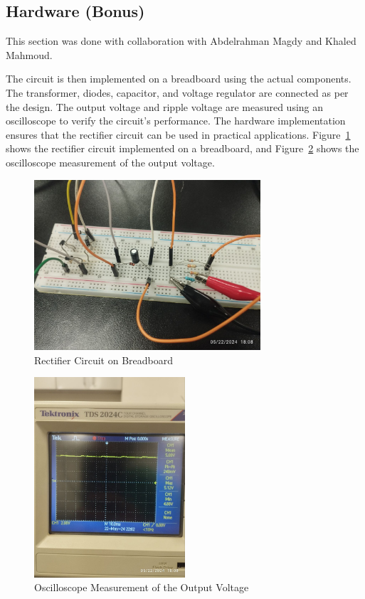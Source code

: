 \documentclass{zc-ust-hw}
\begin{document}
\subsection{Hardware (Bonus)}

This section was done with collaboration with Abdelrahman Magdy and Khaled Mahmoud.

The circuit is then implemented on a breadboard using the actual components. The
transformer, diodes, capacitor, and voltage regulator are connected as per the
design. The output voltage and ripple voltage are measured using an oscilloscope
to verify the circuit's performance. The hardware implementation ensures that
the rectifier circuit can be used in practical applications. Figure~\ref{fig:breadboard-circuit} shows the rectifier circuit implemented on a breadboard, and Figure~\ref{fig:oscilloscope-measurement} shows the oscilloscope measurement of the output voltage.

\begin{figure}[h]
  \begin{center}
    \includegraphics[width=0.75\textwidth]{figures/photo_2024-05-24_00-16-43.jpg}
  \end{center}
  \caption{Rectifier Circuit on Breadboard}
  \label{fig:breadboard-circuit}
\end{figure}

\begin{figure}[H]
  \begin{center}
    \includegraphics[width=0.5\textwidth]{figures/photo_2024-05-24_00-16-45.jpg}
  \end{center}
  \caption{Oscilloscope Measurement of the Output Voltage}
  \label{fig:oscilloscope-measurement}
\end{figure}
\end{document}
